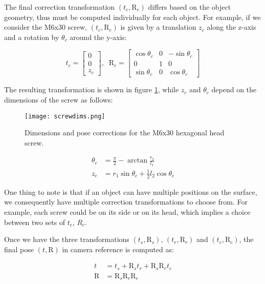 The final correction transformation $(t_c, \text{R}_c)$ differs based on the object geometry, thus must be computed individually for each object. For example, if we consider the M6x30 screw, $(t_c, \text{R}_c)$ is given by a translation $z_c$ along the z-axis and a rotation by $\theta_c$ around the y-axis:

\begin{equation*}
    t_c = 
    \begin{bmatrix}
        0\\0\\z_c
    \end{bmatrix}
    ,\; \; \text{R}_c =
    \begin{bmatrix}
        \cos \theta_c & 0 & -\sin \theta_c\\
        0 & 1 & 0\\
        \sin \theta_c & 0 &  \cos \theta_c
    \end{bmatrix}
\end{equation*}

The resulting transformation is shown in figure \ref*{fig:screwdim}, while $z_c$ and $\theta_c$ depend on the dimensions of the screw as follows:

\begin{figure}[ht]
    \texttt{[image: screwdims.png]}
    \caption{Dimensions and pose corrections for the M6x30 hexagonal head screw.}
    \label{fig:screwdim}
\end{figure}

\begin{align*}
    \theta_c &= \frac{\pi}{2} - \arctan \frac{r_2}{l_1}\\
    z_c &= r_1 \sin \theta_c + \frac{1}{2} l_2 \cos \theta_c
\end{align*}

One thing to note is that if an object can have multiple positions on the surface, we consequently have multiple correction transformations to choose from. For example, each screw could be on its side or on its head, which implies a choice between two sets of $t_c$, $R_c$.

Once we have the three transformations $(t_s, \text{R}_s)$, $(t_r, \text{R}_r)$ and $(t_c, \text{R}_c)$, the final pose $(t, \text{R})$ in camera reference is computed as:

\begin{align*}
    t &= t_s + \text{R}_s t_r + \text{R}_s \text{R}_r t_c\\
    \text{R} &= \text{R}_s \text{R}_r \text{R}_c
\end{align*}


